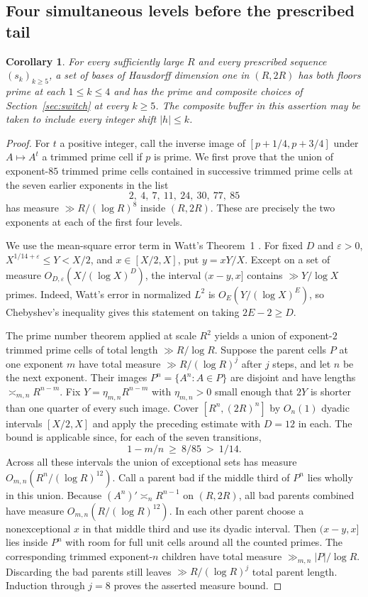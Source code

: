 \documentclass[11pt]{article}
\newtheorem{corollary}[theorem]{Corollary}
\theoremstyle{remark}\newtheorem*{remark}{Remark}
\begin{document}
\subsection{Four simultaneous levels before the prescribed tail}
\label{sec:fourdouble}

\begin{corollary}\label{cor:four}For every sufficiently large $R$ and every prescribed sequence
$(s_k)_{k\ge5}$, a set of bases of Hausdorff dimension one in $(R,2R)$
has both floors prime at each $1\le k\le4$ and has the prime and
composite choices of Section~\ref{sec:switch} at every $k\ge5$.
The composite buffer in this assertion may be taken to include every
integer shift $|h|\le k$.
\end{corollary}

\begin{proof}
For $t$ a positive integer, call the inverse image of
$[p+1/4,p+3/4]$ under $A\mapsto A^t$ a trimmed prime cell if $p$ is
prime. We first prove that the union of exponent-$85$ trimmed prime
cells contained in successive trimmed prime cells at the seven earlier
exponents in the list
\[
        2,\ 4,\ 7,\ 11,\ 24,\ 30,\ 77,\ 85
\]
has measure $\gg R/(\log R)^8$ inside $(R,2R)$. These are precisely
the two exponents at each of the first four levels.

We use the mean-square error term in Watt's Theorem~1 \cite{watt}. For fixed $D$ and $\varepsilon>0$,
$X^{1/14+\varepsilon}\le Y<X/2$, and $x\in[X/2,X]$,
put $y=xY/X$. Except on a set of measure $O_{D,\varepsilon}
(X/(\log X)^D)$, the interval $(x-y,x]$ contains $\gg Y/\log X$
primes. Indeed, Watt's error in normalized $L^2$ is
$O_E(Y/(\log X)^E)$, so Chebyshev's inequality gives this statement
on taking $2E-2\ge D$.

The prime number theorem applied at scale $R^2$ yields a union of
exponent-$2$ trimmed prime cells of total length $\gg R/\log R$.
Suppose the parent cells $P$ at one exponent $m$ have total measure
$\gg R/(\log R)^j$ after $j$ steps, and let $n$ be the next exponent.
Their images $P^n=\{A^n:A\in P\}$ are disjoint and have lengths
$\asymp_{m,n}R^{n-m}$. Fix $Y=\eta_{m,n} R^{n-m}$ with
$\eta_{m,n}>0$ small enough that $2Y$ is shorter than one quarter of
every such image. Cover $[R^n,(2R)^n]$ by $O_n(1)$ dyadic intervals
$[X/2,X]$ and apply the preceding estimate with $D=12$ in each.
The bound is applicable since, for each of the seven transitions,
\[
              1-m/n\ \ge\ 8/85\ >\ 1/14 .
\]
Across all these intervals the union of exceptional sets has measure
$O_{m,n}(R^n/(\log R)^{12})$. Call a parent bad if the middle third
of $P^n$ lies wholly in this union. Because $(A^n)'\asymp_n R^{n-1}$
on $(R,2R)$, all bad parents combined have measure
$O_{m,n}(R/(\log R)^{12})$. In each other parent choose a
nonexceptional $x$ in that middle third and use its dyadic interval.
Then $(x-y,x]$ lies inside $P^n$ with room for full unit cells around
all the counted primes. The corresponding trimmed exponent-$n$
children have total measure $\gg_{m,n}|P|/\log R$.
Discarding the bad parents still leaves $\gg R/(\log R)^j$ total
parent length. Induction through $j=8$ proves the asserted measure bound.


\end{proof}
\end{document}
